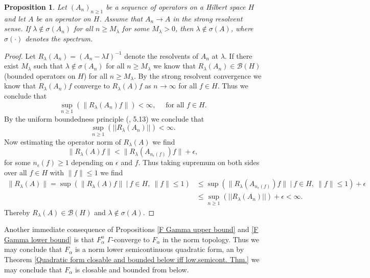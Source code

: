 \documentclass[a4paper,11pt]{article}
\newtheorem{proposition}{Proposition}
\numberwithin{equation}{section}
\begin{document}
\begin{proposition}
	Let $ (A_n)_{n\geq1} $ be a sequence of operators on a Hilbert space $ H $ and let $ A $ be an operator on $ H $. Assume that $ A_n\to A $ in the strong resolvent sense. If $ \lambda\notin\sigma(A_n) $ for all $ n\geq M_\lambda $ for some $ M_\lambda>0$, then $ \lambda\notin\sigma(A) $, where $ \sigma(\cdot) $ denotes the spectrum.
\end{proposition}
\begin{proof}
	Let $ R_\lambda(A_n)=(A_n-\lambda I)^{-1} $ denote the resolvents of $ A_n $ at $ \lambda $. If there exist $ M_\lambda $ such that $ \lambda\notin\sigma(A_n) $ for all $ n\geq M_\lambda $ we know that $ R_\lambda(A_n)\in\mathcal{B}(H) $ (bounded operators on $ H $) for all $ n\geq M_\lambda $. By the strong resolvent convergence we know that $ R_\lambda(A_n)f $ converge to $ R_\lambda(A)f $ as $ n\to\infty $ for all $ f\in H $. Thus we conclude that \begin{equation}
	\sup_{n\geq1}\left(\|R_\lambda(A_n)f\|\right)<\infty,\quad \text{ for all }f\in H.
	\end{equation}
	By the uniform boundedness principle (\cite{Folland}, 5.13) we conclude that \begin{equation}
	\sup_{n\geq1}\left(||R_\lambda(A_n)||\right)<\infty.
	\end{equation}
	Now estimating the operator norm of $ R_\lambda(A) $ we find \begin{equation}
	\|R_\lambda(A)f \|<\|R_{\lambda}(A_{n_\epsilon(f)})f \|+\epsilon,
	\end{equation}
	for some $ n_\epsilon(f)\geq1 $ depending on $ \epsilon $ and $ f $. Thus taking supremum on both sides over all $ f\in H $ with $ \|f\|\leq1 $ we find\begin{equation}
	\begin{aligned}
	\|R_\lambda(A)\|=\sup\left(\|R_\lambda(A)f \|\ |\ f\in H,\ \|f\|\leq1\right)&\leq\sup\left(\|R_\lambda(A_{n_\epsilon(f)})f \|\ |\ f\in H,\ \|f\|\leq1\right)+\epsilon\\& \leq\sup_{n\geq1}\left(||R_\lambda(A_n)||\right)+\epsilon<\infty.
	\end{aligned}
	\end{equation}
	Thereby $ R_\lambda(A)\in\mathcal{B}(H) $ and $ \lambda\notin\sigma(A) $.
\end{proof}
Another immediate consequence of Propositions \ref{F Gamma upper bound} and \ref{F Gamma lower bound} is that $ F_\alpha^n $ $ \Gamma $-converge to $ F_\alpha $ in the norm topology. Thus we may conclude that $ F_\alpha $ is a norm lower semicontinuous quadratic form, an by Theorem \ref{Quadratic form closable and bounded below iff low.semicont. Thm.} we may conclude that $ F_\alpha $ is closable and bounded from below.
\end{document}
